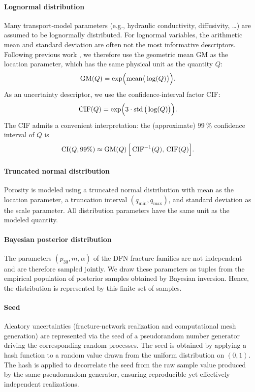 \paragraph{Lognormal distribution}
Many transport-model parameters (e.g., hydraulic conductivity, diffusivity,
\dots) are assumed to be lognormally distributed. For lognormal variables, the
arithmetic mean and standard deviation are often not the most informative
descriptors. Following previous work \cite{tz_design}, we therefore use the
geometric mean \Gls{GM} as the location parameter, which has the same physical
unit as the quantity $Q$:
\[
\operatorname{GM}(Q) = \exp\!\Big(\mathrm{mean}\big(\log(Q)\big)\Big).
\]
As an uncertainty descriptor, we use the confidence-interval factor \Gls{CIF}:
\[
\operatorname{CIF}(Q) = \exp\!\Big(3 \cdot \operatorname{std}\big(\log(Q)\big)\Big).
\]
The \Gls{CIF} admits a convenient interpretation: the (approximate) $99~\%$
confidence interval of $Q$ is
\[
\operatorname{CI}(Q,99\%) \approx \operatorname{GM}(Q)\,\Big[\operatorname{CIF}^{-1}(Q),\, \operatorname{CIF}(Q)\Big].
\]

\paragraph{Truncated normal distribution}
Porosity is modeled using a truncated normal distribution with mean as the
location parameter,  a truncation interval $(q_{\min}, q_{\max})$, and standard
deviation as the scale parameter. All distribution parameters have the same
unit as the modeled quantity.

\paragraph{Bayesian posterior distribution}
The parameters $(p_{30}, m, \alpha)$ of the DFN fracture families are not
independent and are therefore sampled jointly. We draw these parameters as
tuples from the empirical population of posterior samples obtained by Bayesian
inversion. Hence, the distribution is represented by this finite set of
samples.

\paragraph{Seed}
Aleatory uncertainties (fracture-network realization and computational mesh
generation) are represented via the seed of a pseudorandom number generator
driving the corresponding random processes. The seed is obtained by applying a
hash function to a random value drawn from the uniform distribution on $(0,1)$.
The hash is applied to decorrelate the seed from the raw sample value produced
by the same pseudorandom generator, ensuring reproducible yet effectively
independent realizations.

